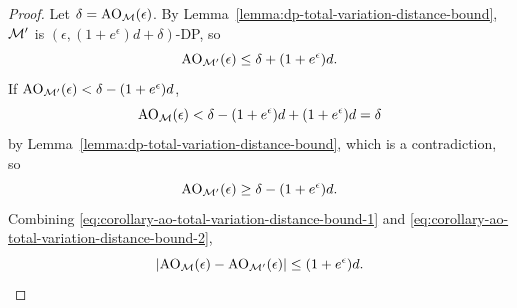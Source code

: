 \documentclass{article}
\theoremstyle{plain}
\theoremstyle{definition}
\theoremstyle{remark}
\begin{document}
\begin{proof}
    Let $\delta = \mathrm{AO}_{\mathcal{M}}(\epsilon)$. By Lemma~\ref{lemma:dp-total-variation-distance-bound},
    $\mathcal{M}'$ is $(\epsilon, (1 + e^\epsilon)d + \delta)$-DP, so
    \begin{equation}
        \mathrm{AO}_{\mathcal{M}'}(\epsilon) \leq \delta + (1 + e^\epsilon)d. 
        \label{eq:corollary-ao-total-variation-distance-bound-1}
    \end{equation}
    If 
    $\mathrm{AO}_{\mathcal{M}'}(\epsilon) < \delta - (1 + e^\epsilon)d$, 
    \begin{equation}
        \mathrm{AO}_{\mathcal{M}}(\epsilon) < \delta - (1 + e^\epsilon)d + (1 + e^\epsilon)d = \delta
    \end{equation}
    by Lemma~\ref{lemma:dp-total-variation-distance-bound}, which is a contradiction,
    so 
    \begin{equation}
        \mathrm{AO}_{\mathcal{M}'}(\epsilon) \geq \delta - (1 + e^\epsilon)d. 
        \label{eq:corollary-ao-total-variation-distance-bound-2}
    \end{equation}
    Combining \eqref{eq:corollary-ao-total-variation-distance-bound-1} and
    \eqref{eq:corollary-ao-total-variation-distance-bound-2},
    \begin{equation}
        |\mathrm{AO}_{\mathcal{M}}(\epsilon) - \mathrm{AO}_{\mathcal{M}'}(\epsilon)| \leq (1 + e^\epsilon)d. \qedhere
    \end{equation}
\end{proof}

\end{document}

